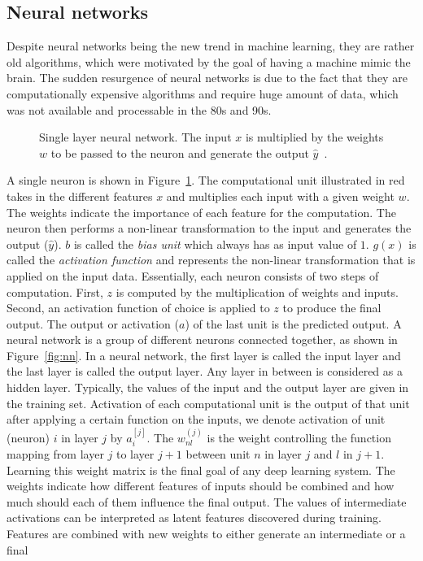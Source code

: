 \subsection{Neural networks}
Despite neural networks being the new trend in machine learning, they are rather old algorithms, which were motivated by the goal of having a machine mimic the brain. The sudden resurgence of neural networks is due to the fact that they are computationally expensive algorithms and require huge amount of data, which was not available and processable in the 80s and 90s. \\
\begin{figure}
\centering 
\resizebox{0.55\textwidth}{0.3\textwidth}{      

}
\caption{Single layer neural network. The input $x$ is multiplied by the weights $w$ to be passed to the neuron and generate the output $\hat { y }$~.}
\label{fig:preceptron}
\end{figure}
A single neuron is shown in Figure~\ref{fig:preceptron}. The computational unit illustrated in red takes in the different features $x$ and multiplies each input with a given weight $w$. The weights indicate the importance of each feature for the computation. The neuron then performs a non-linear transformation to the input and generates the output ($\hat { y } $). $b$ is called the \emph{bias unit} which always has as input value of $1$. $g(x)$ is called the \emph{activation
function} and represents the non-linear transformation that is applied on the input data. Essentially, each neuron consists of two steps of computation. First, $z$ is computed by the multiplication of weights and inputs. Second, an activation function of choice is applied to $z$ to produce the final output. The output or activation ($a$) of the last unit is the predicted output. A neural network is a group of different neurons connected together, as shown in Figure~\ref{fig:nn}. In a
neural network, the first layer is called the input layer and the last layer is called the output layer. Any layer in between is considered as a hidden layer. Typically, the values of the input and the output layer are given in the training set. Activation of each computational unit is the output of that unit after applying a certain function on the inputs, we denote activation of unit (neuron) $i$ in layer $j$ by $a_{i}^{[j]}$. The $w^{(j)}_{nl}$ is the weight controlling the function mapping from layer $j$ to layer $j+1$ between unit $n$ in layer $j$ and $l$ in $j+1$. Learning this weight matrix is the final goal of any deep learning system. The weights indicate how different features of inputs should be combined and how much should each of them influence the final output. The values of intermediate activations can be interpreted as latent features discovered during training. Features are combined with new weights to either generate an intermediate or a final
